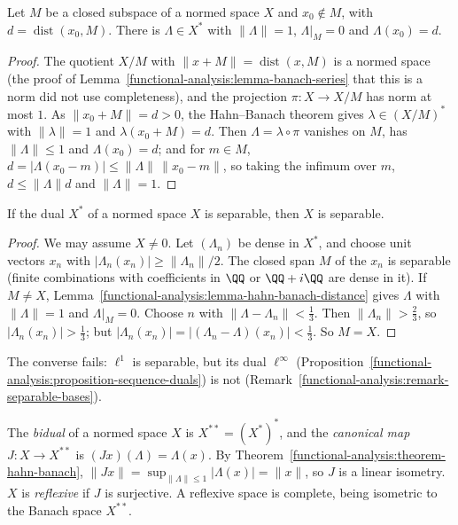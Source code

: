 \begin{lemma}\label{functional-analysis:lemma-hahn-banach-distance}
Let $M$ be a closed subspace of a normed space $X$ and $x_0 \notin M$, with $d = \operatorname{dist}(x_0, M)$. There is $\Lambda \in X^*$ with $\|\Lambda\| = 1$, $\Lambda|_M = 0$ and $\Lambda(x_0) = d$.
\end{lemma}

\begin{proof}
The quotient $X/M$ with $\|x + M\| = \operatorname{dist}(x, M)$ is a normed space (the proof of Lemma~\ref{functional-analysis:lemma-banach-series} that this is a norm did not use completeness), and the
projection $\pi \colon X \to X/M$ has norm at most $1$. As $\|x_0 + M\| = d > 0$, the Hahn--Banach theorem gives $\lambda \in (X/M)^*$ with $\|\lambda\| = 1$ and $\lambda(x_0 + M) = d$. Then $\Lambda = \lambda \circ \pi$
vanishes on $M$, has $\|\Lambda\| \leq 1$ and $\Lambda(x_0) = d$; and for $m \in M$, $d = |\Lambda(x_0 - m)| \leq \|\Lambda\|\,\|x_0 - m\|$, so taking the infimum over $m$, $d \leq \|\Lambda\|d$ and $\|\Lambda\| = 1$.
\end{proof}

\begin{lemma}\label{functional-analysis:lemma-dual-separable}
If the dual $X^*$ of a normed space $X$ is separable, then $X$ is separable.
\end{lemma}

\begin{proof}
We may assume $X \neq 0$. Let $(\Lambda_n)$ be dense in $X^*$, and choose unit vectors $x_n$ with $|\Lambda_n(x_n)| \geq \|\Lambda_n\|/2$. The closed span $M$ of the $x_n$ is separable (finite combinations with
coefficients in $\QQ$ or $\QQ + i\QQ$ are dense in it). If $M \neq X$, Lemma~\ref{functional-analysis:lemma-hahn-banach-distance} gives $\Lambda$ with $\|\Lambda\| = 1$ and $\Lambda|_M = 0$. Choose $n$ with
$\|\Lambda - \Lambda_n\| < \frac13$. Then $\|\Lambda_n\| > \frac23$, so $|\Lambda_n(x_n)| > \frac13$; but $|\Lambda_n(x_n)| = |(\Lambda_n - \Lambda)(x_n)| < \frac13$. So $M = X$.
\end{proof}

The converse fails: $\ell^1$ is separable, but its dual $\ell^\infty$ (Proposition~\ref{functional-analysis:proposition-sequence-duals}) is not (Remark~\ref{functional-analysis:remark-separable-bases}).

\begin{definition}\label{functional-analysis:definition-reflexive}
The \emph{bidual} of a normed space $X$ is $X^{**} = (X^*)^*$, and the \emph{canonical map} $J \colon X \to X^{**}$ is $(Jx)(\Lambda) = \Lambda(x)$. By Theorem~\ref{functional-analysis:theorem-hahn-banach},
$\|Jx\| = \sup_{\|\Lambda\| \leq 1}|\Lambda(x)| = \|x\|$, so $J$ is a linear isometry. $X$ is \emph{reflexive} if $J$ is surjective. A reflexive space is complete, being isometric to the Banach space $X^{**}$.
\end{definition}

